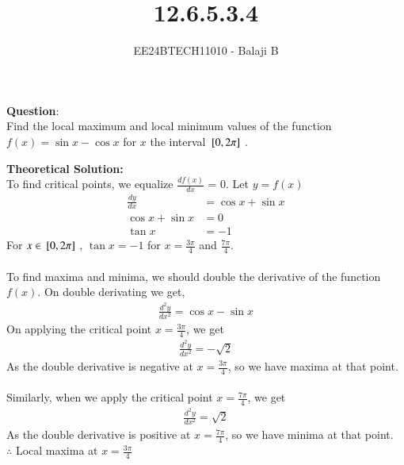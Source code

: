 \documentclass[journal]{IEEEtran}
\begin{document}

\vspace{3cm}

\title{12.6.5.3.4}
\author{EE24BTECH11010 - Balaji B}
{\let\newpage\relax\maketitle}

\renewcommand{\thefigure}{\theenumi}
\renewcommand{\thetable}{\theenumi}
\setlength{\intextsep}{10pt} %


\renewcommand{\thetable}{\theenumi}


\textbf{Question}:\\
Find the local maximum and local minimum values of the function $f(x) = \sin{x} - \cos{x}$ for $x$ the interval ${}\left[0,2\pi\right]$ .

\textbf{Theoretical Solution:}\\
To find critical points, we equalize $\frac{df(x)}{dx}$ = 0. Let $y = f(x)$
\begin{align}
\frac{dy}{dx} &= \cos{x} + \sin{x} \\
 \cos{x} + \sin{x} &= 0 \\
 \tan{x} &= -1
\end{align}
For $x \in {}\left[0,2\pi\right]$ , $\tan{x} = -1$ for $x = \frac{3\pi}{4}$ and $\frac{7\pi}{4}$.\\\\
To find maxima and minima, we should double the derivative of the function $f(x)$. On double derivating we get,
\begin{align}
    \frac{d^2y}{dx^2} = \cos{x} - \sin{x}
\end{align}
On applying the critical point $x = \frac{3\pi}{4}$, we get
\begin{align}
    \frac{d^2y}{dx^2} = -\sqrt{2}
\end{align}
As the double derivative is negative at $x = \frac{3\pi}{4} $, so we have maxima at that point.\\\\
Similarly, when we apply the critical point $x = \frac{7\pi}{4}$, we get
\begin{align}
\frac{d^2y}{dx^2} = \sqrt{2}
\end{align}
As the double derivative is positive at $x = \frac{7\pi}{4} $, so we have minima at that point.\\
$\therefore$ Local maxima at $x = \frac{3\pi}{4}$
\end{document}
